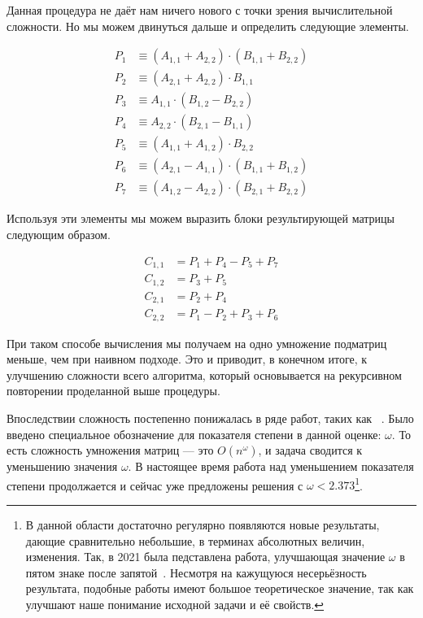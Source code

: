 Данная процедура не даёт нам ничего нового с точки зрения вычислительной сложности. Но мы можем двинуться дальше и определить следующие элементы.

\begin {align*}
P_1 & \equiv (A_{1,1} + A_{2,2}) \cdot (B_{1,1} + B_{2,2}) \\
P_2 & \equiv (A_{2,1} + A_{2,2}) \cdot B_{1,1} \\
P_3 & \equiv A_{1,1} \cdot (B_{1,2} - B_{2,2}) \\
P_4 & \equiv A_{2,2} \cdot (B_{2,1} - B_{1,1}) \\
P_5 & \equiv (A_{1,1} + A_{1,2}) \cdot B_{2,2}  \\
P_6 & \equiv (A_{2,1} - A_{1,1}) \cdot (B_{1,1} + B_{1,2}) \\
P_7 & \equiv (A_{1,2} - A_{2,2}) \cdot (B_{2,1} + B_{2,2})
\end {align*}

Используя эти элементы мы можем выразить блоки результирующей матрицы следующим образом.

\begin {align*}
C_{1,1} & = P_1 + P_4 - P_5 + P_7 \\
C_{1,2} & = P_3 + P_5 \\
C_{2,1} & = P_2 + P_4 \\
C_{2,2} & = P_1 - P_2 + P_3 + P_6
\end {align*}

При таком способе вычисления мы получаем на одно умножение подматриц меньше, чем при наивном подходе. Это и приводит, в конечном итоге, к улучшению сложности всего алгоритма, который основывается на рекурсивном повторении проделанной выше процедуры.

Впоследствии сложность постепенно понижалась в ряде работ, таких как ~\cite{Pan1978,BiniCapoRoma1979,Schonhage1981,CoppWino1982,CoppWino1990}. Было введено специальное обозначение для показателя степени в данной оценке: $\omega$. То есть сложность умножения матриц --- это $O(n^\omega)$, и задача сводится к уменьшению значения $\omega$. В настоящее время работа над уменьшением показателя степени продолжается и сейчас уже предложены решения с $\omega < 2.373$\footnote{В данной области достаточно регулярно появляются новые результаты, дающие сравнительно небольшие, в терминах абсолютных величин, изменения. Так, в 2021 была педставлена работа, улучшающая значение $\omega$ в пятом знаке после запятой~\cite{alman2020refined}. Несмотря на кажущуюся несерьёзность результата, подобные работы имеют большое теоретическое значение, так как улучшают наше понимание исходной задачи и её свойств.}.

